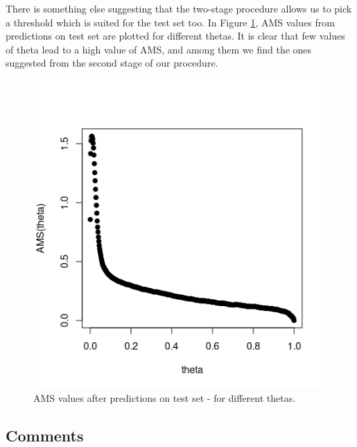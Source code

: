 \documentclass[]{article}
\begin{document}
There is something else suggesting that the two-stage procedure allows us to pick a threshold which is suited for the test set too. In Figure \ref{fig: AMS on test}, AMS values from predictions on test set are plotted for different thetas. It is clear that few values of theta lead to a high value of AMS, and among them we find the ones suggested from the second stage of our procedure. 

\begin{figure}[H]
\centering
\includegraphics[scale=0.7]{../Pictures/testbadpractice.png}
\caption{AMS values after predictions on test set - for different thetas.}
\label{fig: AMS on test}
\end{figure}

\subsection{Comments}





\end{document}
